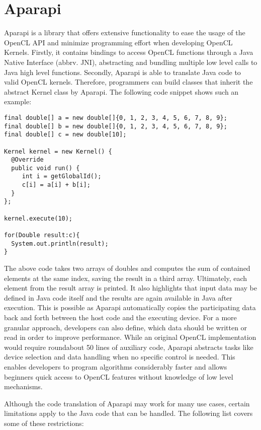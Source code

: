 \section{Aparapi}
\label{aparapi}
Aparapi is a library that offers extensive functionality to ease the usage of the OpenCL API and minimize programming effort when developing OpenCL Kernels. Firstly, it contains bindings to access OpenCL functions through a Java Native Interface (abbrv. JNI), abstracting and bundling multiple low level calls to Java high level functions. Secondly, Aparapi is able to translate Java code to valid OpenCL kernels. Therefore, programmers can build classes that inherit the abstract Kernel class by Aparapi. The following code snippet shows such an example:

\begin{lstlisting}
final double[] a = new double[]{0, 1, 2, 3, 4, 5, 6, 7, 8, 9};
final double[] b = new double[]{0, 1, 2, 3, 4, 5, 6, 7, 8, 9};
final double[] c = new double[10];

Kernel kernel = new Kernel() {
  @Override
  public void run() {
     int i = getGlobalId();
     c[i] = a[i] + b[i];
  }
};

kernel.execute(10);

for(Double result:c){
  System.out.println(result);
}
\end{lstlisting}

The above code takes two arrays of doubles and computes the sum of contained elements at the same index, saving the result in a third array. Ultimately, each element from the result array is printed. It also highlights that input data may be defined in Java code itself and the results are again available in Java after execution. This is possible as Aparapi automatically copies the participating data back and forth between the host code and the executing device. For a more granular approach, developers can also define, which data should be written or read in order to improve performance. While an original OpenCL implementation would require roundabout 50 lines of auxiliary code, Aparapi abstracts tasks like device selection and data handling when no specific control is needed. This enables developers to program algorithms considerably faster and allows beginners quick access to OpenCL features without knowledge of low level mechanisms.

Although the code translation of Aparapi may work for many use cases, certain limitations apply to the Java code that can be handled. The following list covers some of these restrictions:

